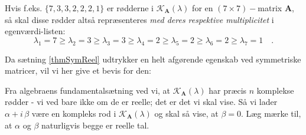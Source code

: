 \begin{think}
Hvis f.eks. $\{7, 3,3, 2, 2,2,1\}$ er rødderne i $\mathcal{K}_{\mathbf{A}}(\lambda)$ for en $(7 \times 7)-$matrix $\mathbf{A}$, så skal disse rødder altså repræsenteres {\em{med deres respektive multiplicitet}} i egenværdi-listen:
\begin{equation*}
\lambda_{1} = 7 \geq \lambda_{2} = 3 \geq \lambda_{3} = 3 \geq \lambda_{4} = 2 \geq \lambda_{5} = 2 \geq \lambda_{6} = 2 \geq \lambda_{7} = 1 \quad.
\end{equation*}
\end{think}
Da sætning \ref{thmSymReel} udtrykker en helt afgørende egenskab ved symmetriske matricer, vil vi her give et bevis for den:
\begin{bevis}
Fra algebraens fundamentalsætning ved vi, at $\mathcal{K}_{\mathbf{A}}(\lambda)$ har præcis $n$ komplekse rødder - vi ved bare ikke om de er reelle; det er det vi skal vise. Så vi lader $\alpha + i\,\beta$ være en kompleks rod i $\mathcal{K}_{\mathbf{A}}(\lambda)$ og skal så vise, at $\beta = 0$. Læg mærke til, at $\alpha$ og $\beta$ naturligvis begge er reelle tal.


\end{bevis}
